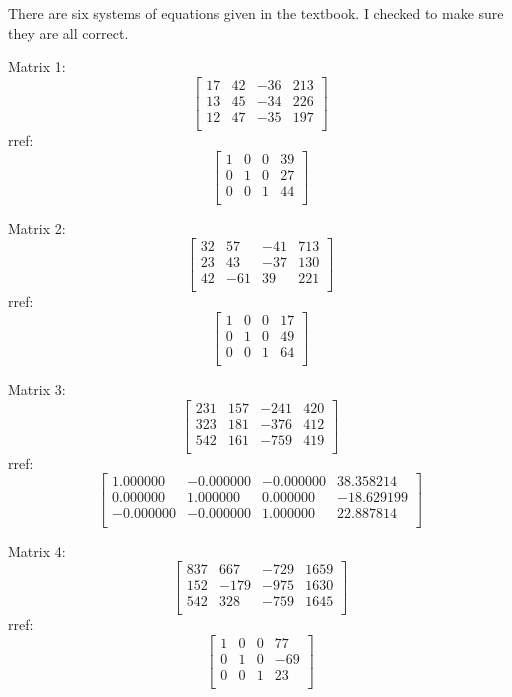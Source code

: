 \documentclass{article}
\begin{document}
\begin{flushleft}
There are six systems of equations given in the textbook. I checked to make sure they are
all correct. \newline


Matrix 1:
\[ 
\begin{bmatrix} 
17  & 42  & -36  & 213 \\
13  & 45  & -34  & 226 \\
12  & 47  & -35  & 197 \\
\end{bmatrix} 
 \]
rref:
\[ 
\begin{bmatrix} 
1  & 0  & 0  & 39 \\
0  & 1  & 0  & 27 \\
0  & 0  & 1  & 44 \\
\end{bmatrix} 
 \]


Matrix 2:
\[ 
\begin{bmatrix} 
32  & 57  & -41  & 713 \\
23  & 43  & -37  & 130 \\
42  & -61  & 39  & 221 \\
\end{bmatrix} 
 \]
rref:
\[ 
\begin{bmatrix} 
1  & 0  & 0  & 17 \\
0  & 1  & 0  & 49 \\
0  & 0  & 1  & 64 \\
\end{bmatrix} 
 \]


Matrix 3:
\[ 
\begin{bmatrix} 
231  & 157  & -241  & 420 \\
323  & 181  & -376  & 412 \\
542  & 161  & -759  & 419 \\
\end{bmatrix} 
 \]
rref:
\[ 
\begin{bmatrix} 
1.000000  & -0.000000  & -0.000000  & 38.358214 \\
0.000000  & 1.000000  & 0.000000  & -18.629199 \\
-0.000000  & -0.000000  & 1.000000  & 22.887814 \\
\end{bmatrix} 
 \]


Matrix 4:
\[ 
\begin{bmatrix} 
837  & 667  & -729  & 1659 \\
152  & -179  & -975  & 1630 \\
542  & 328  & -759  & 1645 \\
\end{bmatrix} 
 \]
rref:
\[ 
\begin{bmatrix} 
1  & 0  & 0  & 77 \\
0  & 1  & 0  & -69 \\
0  & 0  & 1  & 23 \\
\end{bmatrix} 
 \]



\end{flushleft}
\end{document}
